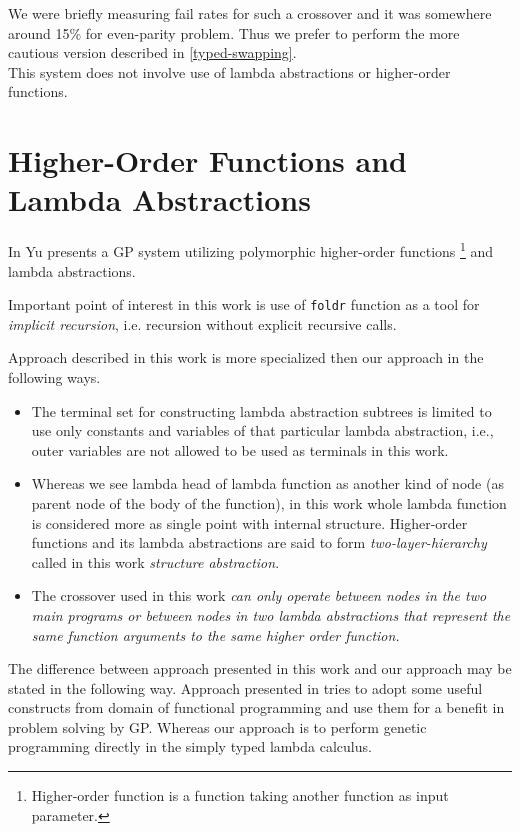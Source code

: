 \documentclass[12pt,a4paper]{report}
\begin{document}
We were briefly measuring fail rates for such a crossover and
it was somewhere around 15\% for even-parity problem. Thus we prefer
to perform the more cautious version described in \ref{typed-swapping}.  \\

This system does not involve use of lambda abstractions or
higher-order functions.

\section{Higher-Order Functions and Lambda Abstractions} 
In \cite{yu01} Yu presents a GP system utilizing
polymorphic higher-order functions 
\footnote{Higher-order function is a function taking another function as 
input parameter.} and lambda abstractions.

Important point of interest in this work is use of
\texttt{foldr} function as a tool for \textit{implicit recursion},
i.e. recursion without explicit recursive calls. 

Approach described in this work is more specialized then our approach
in the following ways.

\begin{itemize}
\item The terminal set for constructing lambda abstraction subtrees 
      is limited to use only constants and variables of that particular
      lambda abstraction, i.e., outer variables are not allowed to be used
      as terminals in this work.
\item  Whereas we see lambda head of lambda function as 
another kind of node (as parent node of the body of the function), 
in this work whole lambda function is considered more as single
point with internal structure. Higher-order functions
and its lambda abstractions are said to form \textit{two-layer-hierarchy}
called in this work \textit{structure abstraction}.
\item The crossover used in this work \textit{can only operate 
between nodes in the two main programs or 
between nodes in two lambda abstractions that represent 
the same function arguments to the same higher order function. }
\end{itemize}

The difference between approach presented in this work and our approach 
may be stated in the following way. Approach presented in \cite{yo01}
tries to adopt some useful constructs from domain
of functional programming and use them for a benefit in problem solving by GP.
Whereas our approach is to perform genetic programming directly in the
simply typed lambda calculus.
  
\end{document}
